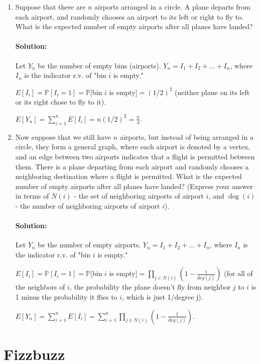 \documentclass[11pt, notitlepage]{article}
\newcommand{\mP}{\mathbb{P}}
\newcommand{\Question}[1]{\newpage\section{#1}}
\newenvironment{solution}{\paragraph{Solution:}}{\hfill \vspace{10mm}}
\begin{document}
\begin{enumerate}[label=\alph*.)]

\item Suppose that there are $n$ airports arranged in a circle. A plane departs from each airport, and randomly chooses an airport to its left or right to fly to. What is the expected number of empty airports after all planes have landed?
\begin{solution}
	Let $Y_n$ be the number of empty bins (airports). $Y_n=I_1 + I_2 +...+ I_n$, where $I_n$ is the indicator r.v. of "bin $i$ is empty." 
	
	$E[I_i] = \mP[I_i=1]=\mP[$bin $i$ is empty$]=(1/2)^2$ (neither plane on its left or its right chose to fly to it).
	
	${E[Y_n]}=\sum_{i=1}^{n}{E[I_i]}=n(1/2)^2=\frac{n}{4}$.
\end{solution}

\item Now suppose that we still have $n$ airports, but instead of being arranged in a circle, they form a general graph, where each airport is denoted by a vertex, and an edge between two airports indicates that a flight is permitted between them. There is a plane departing from each airport and randomly chooses a neighboring destination where a flight is permitted. What is the expected number of empty airports after all planes have landed? (Express your answer in terms of $N(i)$ - the set of neighboring airports of airport $i$, and $\deg(i)$ - the number of neighboring airports of airport $i$).
\begin{solution} Let $Y_n$ be the number of empty airports. $Y_n=I_1 + I_2 +...+ I_n$, where $I_n$ is the indicator r.v. of "bin $i$ is empty." 

	$E[I_i] = \mP[I_i=1]=\mP[$bin $i$ is empty$]=\prod_{j\in N(i)}{(1-\frac{1}{deg(j)})}$ (for all of the neighbors of $i$, the probability the plane doesn't fly from neighbor $j$ to $i$ is 1 minus the probability it flies to $i$, which is just 1/degree j).
	
	${E[Y_n]}=\sum_{i=1}^{n}{E[I_i]}=\sum_{i=1}^{n}{\prod_{j\in N(i)}{(1-\frac{1}{deg(j)})}}$.
\end{solution}
\end{enumerate}


\Question{Fizzbuzz}
\end{document}
